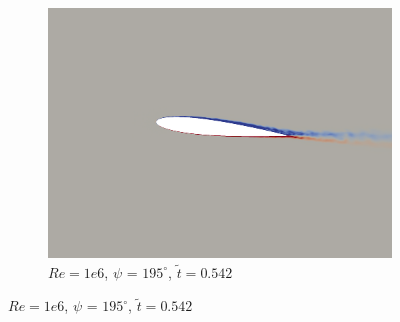 \begin{figure}[H]
\begin{subfigure}[b]{0.32\textwidth}
		\centering
		\includegraphics[width=1\textwidth]{figures/Vorticity_plots/Re_1m_1pt2/phase_195.png}
		\caption{$Re= 1e6$, $\psi$ = $195^\circ$, $\tilde{t}=0.542$}
		\label{fig:Re_1m_1pt2_phi195}
	\end{subfigure}
	

\end{figure}

